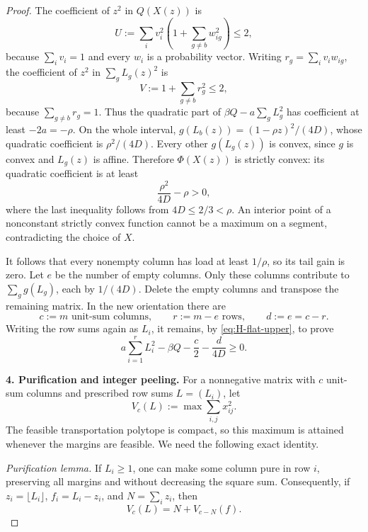 \documentclass[11pt]{article}
\theoremstyle{remark}
\begin{document}
\begin{proof}
The coefficient of $z^2$ in $Q(X(z))$ is
\[
 U:=\sum_i v_i^2\left(1+\sum_{g\neq b}w_{ig}^2\right)\leq2,
\]
because $\sum_iv_i=1$ and every $w_i$ is a probability vector.
Writing $r_g=\sum_iv_iw_{ig}$, the coefficient of $z^2$ in
$\sum_gL_g(z)^2$ is
\[
 V:=1+\sum_{g\neq b}r_g^2\leq2,
\]
because $\sum_{g\neq b}r_g=1$.  Thus the quadratic part of
$\beta Q-a\sum_gL_g^2$ has coefficient at least
$-2a=-\rho$.  On the whole interval,
$g(L_b(z))=(1-\rho z)^2/(4D)$, whose quadratic coefficient is
$\rho^2/(4D)$.  Every other $g(L_g(z))$ is convex, since $g$ is
convex and $L_g(z)$ is affine.  Therefore $\Phi(X(z))$ is strictly
convex: its quadratic coefficient is at least
\[
 \frac{\rho^2}{4D}-\rho>0,
\]
where the last inequality follows from $4D\leq2/3<\rho$.
An interior point of a nonconstant strictly convex function cannot be a
maximum on a segment, contradicting the choice of $X$.

It follows that every nonempty column has load at least $1/\rho$, so
its tail gain is zero.  Let $e$ be the number of empty columns.  Only
these columns contribute to $\sum_g g(L_g)$, each by $1/(4D)$.
Delete the empty columns and transpose the remaining matrix.  In the
new orientation there are
\begin{equation}\label{eq:c-r-d}
 c:=m\text{ unit-sum columns},\qquad
 r:=m-e\text{ rows},\qquad d:=e=c-r.
\end{equation}
Writing the row sums again as $L_i$, it remains, by
\eqref{eq:H-flat-upper}, to prove
\begin{equation}\label{eq:transport-target}
 a\sum_{i=1}^rL_i^2-\beta Q-\frac c2-\frac d{4D}\geq0.
\end{equation}

\medskip
\noindent
\textbf{4. Purification and integer peeling.}
For a nonnegative matrix with $c$ unit-sum columns and prescribed row
sums $L=(L_i)$, let
\[
 V_c(L):=\max\sum_{i,j}x_{ij}^2.
\]
The feasible transportation polytope is compact, so this maximum is
attained whenever the margins are feasible.
We need the following exact identity.

\smallskip
\noindent
\emph{Purification lemma.}
If $L_i\geq1$, one can make some column pure in row $i$, preserving
all margins and without decreasing the square sum.  Consequently, if
$z_i=\lfloor L_i\rfloor$, $f_i=L_i-z_i$, and
$N=\sum_i z_i$, then
\begin{equation}\label{eq:purification-identity}
 V_c(L)=N+V_{c-N}(f).
\end{equation}


\end{proof}
\end{document}
